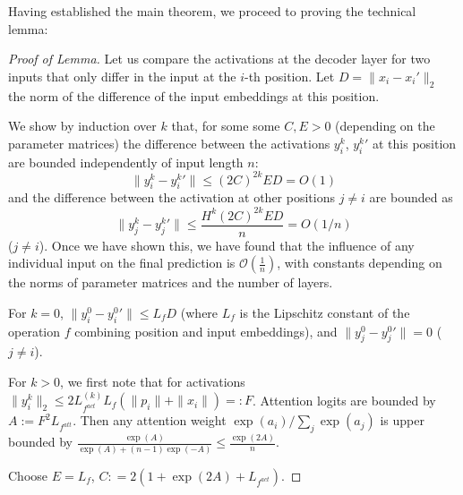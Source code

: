 \documentclass[11pt,a4paper]{article}
\newcounter{theorem}
\begin{document}
Having established the main theorem, we proceed to proving the technical lemma:
\begin{proof}[Proof of Lemma]
Let us compare the activations at the decoder layer for two inputs that only differ in the input at the $i$-th position.
Let $D = \|x_i-x_i'\|_2$ the norm of the difference of the input embeddings at this position.

We show by induction over $k$ that, for some some $C, E > 0$ (depending on the parameter matrices) the difference between the activations $y_i^k$, $y_i^k'$ at this position are bounded independently of input length $n$:
\begin{equation}
\|y_i^k-y_i^k'\| \leq (2C)^{2k}ED = O(1)
\end{equation}
and the difference between the activation at other positions $j\neq i$ are bounded as
\begin{equation}
    \|y_j^k-y_j^k'\| \leq \frac{H^k (2C)^{2k}ED}{n} = O(1/n)
\end{equation} ($j \neq i$).
Once we have shown this, we have found that the influence of any individual input on the final prediction is $\mathcal{O}(\frac{1}{n})$, with constants depending on the norms of parameter matrices and the number of layers.


For $k=0$, $\|y_i^0 - {y_i^0}'\| \leq L_f D$ (where $L_f$ is the Lipschitz constant of the operation $f$ combining position and input embeddings), and $\|y_j^0 - {y_j^0}'\| = 0$ ($j \neq i$).

For $k>0$, we first note that for activations $\|y_i^k\|_2 \leq 2 L_{f^{act}}^{(k)} L_f (\|p_i\| + \|x_i\|) =: F$.
Attention logits are bounded by $A := F^2 L_{f^{att}}$.
Then any attention weight $\exp(a_i)/\sum_j \exp(a_j)$ is upper bounded by $\frac{\exp(A)}{\exp(A) + (n-1) \exp(-A)} \leq \frac{\exp(2A)}{n}$.

Choose $E = L_f$, $C : = 2(1 + \exp(2A) + L_{f^{act}})$.


\end{proof}
\end{document}
